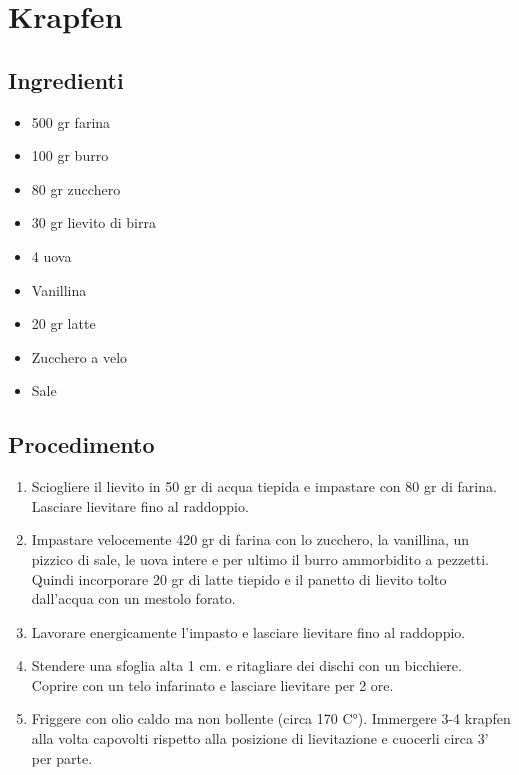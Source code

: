 \section{Krapfen}
\subsection{Ingredienti}
\begin{itemize}
\item 500 gr farina  
\item 100 gr burro  
\item 80 gr zucchero  
\item 30 gr lievito di birra  
\item 4 uova  
\item Vanillina  
\item 20 gr latte  
\item Zucchero a velo  
\item Sale
\end{itemize}
\subsection{Procedimento}
\begin{enumerate}
\item  Sciogliere il lievito in 50 gr di acqua tiepida e impastare con 80 gr di farina. Lasciare lievitare fino al raddoppio.  
\item  Impastare velocemente 420 gr di farina con lo zucchero, la vanillina, un pizzico di sale, le uova intere e per ultimo il burro ammorbidito a pezzetti. Quindi incorporare 20 gr di latte tiepido e il panetto di lievito tolto dall'acqua con un mestolo forato.  
\item  Lavorare energicamente l'impasto e lasciare lievitare fino al raddoppio.  
\item  Stendere una sfoglia alta 1 cm. e ritagliare dei dischi con un bicchiere. Coprire con un telo infarinato e lasciare lievitare per 2 ore.  
\item  Friggere con olio caldo ma non bollente (circa 170 C°). Immergere 3-4 krapfen alla volta capovolti rispetto alla posizione di lievitazione e cuocerli circa 3' per parte.
\end{enumerate}
